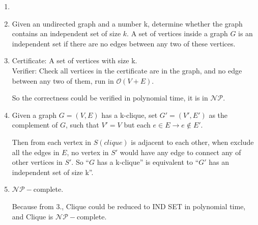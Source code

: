 \documentclass{assignment}
\begin{document}
\begin{homeworkProblem}

\begin{enumerate}
\item 
\item Given an undirected graph and a number k, determine whether the graph contains an independent set of size $k$. A set of vertices inside a graph $G$ is an independent set if there are no edges between any two of these vertices. 
\item Certificate: A set of vertices with size k. \\
Verifier: Check all vertices in the certificate are in the graph, and no edge between any two of them, run in $\mathcal{O}(V+E)$.

So the correctness could be verified in polynomial time, it is in $\mathcal{NP}$.
\item Given a graph $G=(V,E)$ has a k-clique, set $G'=(V',E')$ as the complement of $G$, such that $V'=V$ but each $e \in E \rightarrow e\notin E'$. 

Then from each vertex in $S(clique)$ is adjacent to each other, when exclude all the edges in $E$, no vertex in $S'$ would have any edge to connect any of other vertices in $S'$. So  “$G$ has a k-clique” is equivalent to “$G'$ has an independent set of
size k”.
\item $\mathcal{NP}-$complete.

Because from 3., Clique could be reduced to IND SET in polynomial time, and Clique is  $\mathcal{NP}-$complete.

\end{enumerate}

\end{homeworkProblem}
\end{document}
